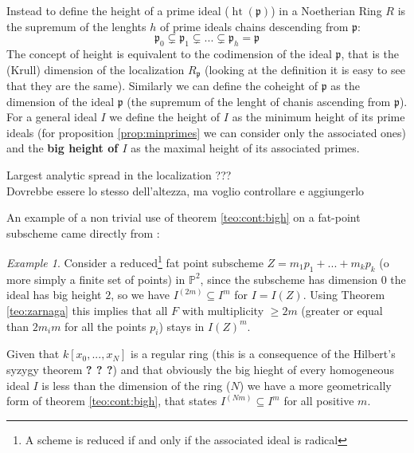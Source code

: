 \documentclass[]{book}
\theoremstyle{plain}
\theoremstyle{remark}
\newtheorem{ex}[rem]{Example}
\theoremstyle{definition}
\newcommand{\PP}{\mathbb{P}}
\newcommand{\p}{\mathfrak{p}}
\newcommand{\cont}[2]{ I^{(#1)} \subseteq I^{#2}}
\DeclareMathOperator{\hgt}{ht}
\begin{document}
	Instead to define the height of a prime ideal ($\hgt ( \p )$) in a Noetherian Ring $ R $ is the supremum of the lenghts $ h $ of prime ideals chains descending from $ \p $:
	\begin{equation}\label{eq:chain}
		\p_0 \subsetneq \p_1 \subsetneq ... \subsetneq \p_{h} = \p
	\end{equation}
	The concept of height is equivalent to the codimension of the ideal $ \p $, that is the (Krull) dimension of the localization $ R_\p $ (looking at the definition it is easy to see that they are the same). Similarly we can define the coheight of $ \p $ as the dimension of the ideal $ \p $ (the supremum of the lenght of chanis ascending from $ \p $). \\
	For a general ideal $ I $ we define the height of $ I $ as the minimum height of its prime ideals (for proposition \ref{prop:minprimes} we can consider only the associated ones) and the \textbf{big height of $ I $} as the maximal height of its associated primes. 
	
	\begin{tboxtodo}
	Largest analytic spread in the localization ???\\
	Dovrebbe essere lo stesso dell'altezza, ma voglio controllare e aggiungerlo
	\end{tboxtodo}
	
	An example of a non trivial use of theorem \ref{teo:cont:bigh} on a fat-point subscheme came directly from \cite[2.3]{EinLazSmi01}:
	
	\begin{ex}\label{es:P2points}
	Consider a reduced\footnote{A scheme is reduced if and only if the associated ideal is radical} fat point subscheme $ Z = m_1 p_1 + ... +  m_k p_k$ (o more simply a finite set of points) in $ \PP^2 $, since the subscheme has dimension $ 0 $ the ideal has big height $ 2 $, so we have $ \cont{2m}{m} $ for $ I = I(Z) $. Using Theorem \ref{teo:zarnaga} this implies that all $ F $ with multiplicity $ \geq 2m $ (greater or equal than $ 2m_im $ for all the points $ p_i $) stays in $ I(Z)^m $. 
	\end{ex}
	
\begin{tboxprop}
	Given that $ k[x_0, ... , x_N] $ is a regular ring (this is a consequence of the Hilbert's syzygy theorem \textbf{? ? ?}) and that obviously the big hieght of every homogeneous ideal $ I $ is less than the dimension of the ring ($ N $) we have a more geometrically form of theorem \ref{teo:cont:bigh}, that states $ \cont{Nm}{m} $ for all positive $ m $. %
\end{tboxprop}
	
\end{document}
